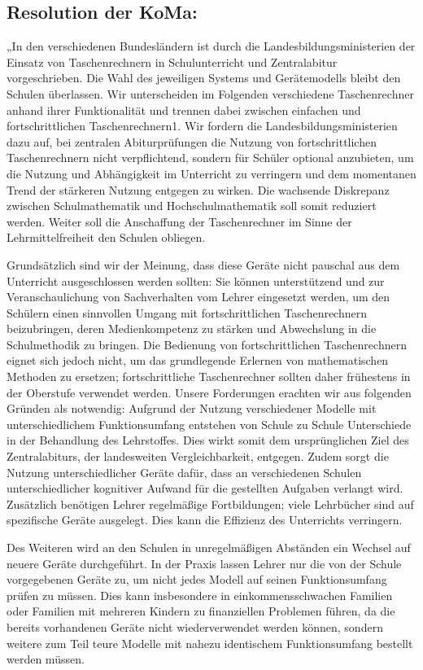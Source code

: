\documentclass[DIV=calc]{scrartcl}
\begin{document}
\subsection*{Resolution der KoMa:}
\begin{addmargin}[1em]{2em}
„In den verschiedenen Bundesländern ist durch die Landesbildungsministerien der
Einsatz von Taschenrechnern in Schulunterricht und Zentralabitur vorgeschrieben. Die Wahl
des jeweiligen Systems und Gerätemodells bleibt den Schulen überlassen. Wir
unterscheiden im Folgenden verschiedene Taschenrechner anhand ihrer Funktionalität und
trennen dabei zwischen einfachen und fortschrittlichen Taschenrechnern1.
Wir fordern die Landesbildungsministerien dazu auf, bei zentralen Abiturprüfungen die
Nutzung von fortschrittlichen Taschenrechnern nicht verpflichtend, sondern für Schüler
optional anzubieten, um die Nutzung und Abhängigkeit im Unterricht zu verringern und
dem momentanen Trend der stärkeren Nutzung entgegen zu wirken. Die wachsende
Diskrepanz zwischen Schulmathematik und Hochschulmathematik soll somit reduziert
werden. Weiter soll die Anschaffung der Taschenrechner im Sinne der Lehrmittelfreiheit den
Schulen obliegen.

Grundsätzlich sind wir der Meinung, dass diese Geräte nicht pauschal aus dem
Unterricht ausgeschlossen werden sollten: Sie können unterstützend und zur
Veranschaulichung von Sachverhalten vom Lehrer eingesetzt werden, um den Schülern
einen sinnvollen Umgang mit fortschrittlichen Taschenrechnern beizubringen, deren
Medienkompetenz zu stärken und Abwechslung in die Schulmethodik zu bringen.
Die Bedienung von fortschrittlichen Taschenrechnern eignet sich jedoch nicht, um das
grundlegende Erlernen von mathematischen Methoden zu ersetzen; fortschrittliche
Taschenrechner sollten daher frühestens in der Oberstufe verwendet werden.
Unsere Forderungen erachten wir aus folgenden Gründen als notwendig: Aufgrund der
Nutzung verschiedener Modelle mit unterschiedlichem Funktionsumfang entstehen von
Schule zu Schule Unterschiede in der Behandlung des Lehrstoffes. Dies wirkt somit dem
ursprünglichen Ziel des Zentralabiturs, der landesweiten Vergleichbarkeit, entgegen. Zudem
sorgt die Nutzung unterschiedlicher Geräte dafür, dass an verschiedenen Schulen
unterschiedlicher kognitiver Aufwand für die gestellten Aufgaben verlangt wird. Zusätzlich
benötigen Lehrer regelmäßige Fortbildungen; viele Lehrbücher sind auf spezifische Geräte
ausgelegt. Dies kann die Effizienz des Unterrichts verringern.

Des Weiteren wird an den Schulen in unregelmäßigen Abständen ein Wechsel auf
neuere Geräte durchgeführt. In der Praxis lassen Lehrer nur die von der Schule
vorgegebenen Geräte zu, um nicht jedes Modell auf seinen Funktionsumfang prüfen zu
müssen. Dies kann insbesondere in einkommensschwachen Familien oder Familien mit
mehreren Kindern zu finanziellen Problemen führen, da die bereits vorhandenen Geräte
nicht wiederverwendet werden können, sondern weitere zum Teil teure Modelle mit nahezu
identischem Funktionsumfang bestellt werden müssen.


\end{addmargin}
\end{document}

